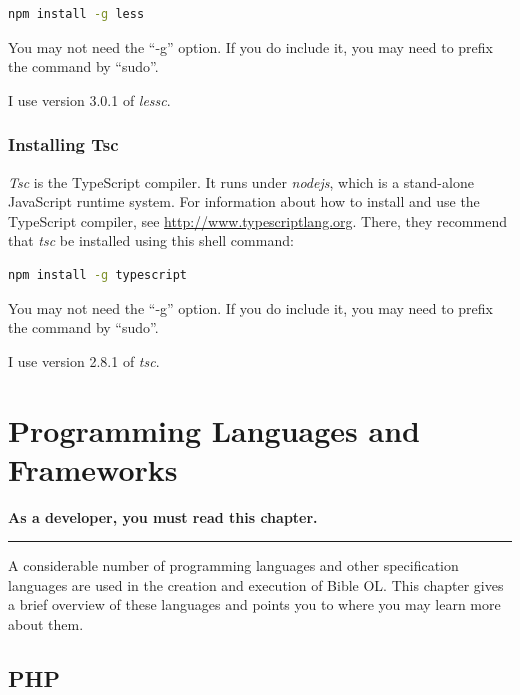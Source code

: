 \documentclass[11pt,oneside,a4paper]{memoir}
\begin{document}
\begin{lstlisting}[language=bash]
npm install -g less
\end{lstlisting}
 
You may not need the ``-g'' option. If you do include it, you may need to prefix the command by
``sudo''.
 
I use version 3.0.1 of \emph{lessc}.

\subsection{Installing Tsc}\label{sec-installing-tsc}\label{sec-install-end}
 
\emph{Tsc} is the TypeScript compiler. It
runs under \emph{nodejs}, which is a stand-alone JavaScript runtime
system. For information about how to install and use the TypeScript compiler, see
\url{http://www.typescriptlang.org}. There, they recommend that \emph{tsc} be installed using this
shell command:
 
\begin{lstlisting}[language=bash]
npm install -g typescript
\end{lstlisting}
 
You may not need the ``-g'' option. If you do include it, you may need to prefix the command by
``sudo''.
 
I use version 2.8.1 of \emph{tsc}.



\chapter{Programming Languages and Frameworks}\label{chap-proglang}

\textbf{As a developer, you must read this chapter.}
\plainbreak{3}

A considerable number of programming languages and other specification languages are used in the
creation and execution of Bible OL. This chapter gives a brief overview of these languages and
points you to where you may learn more about them.


\section{PHP}
\end{document}
